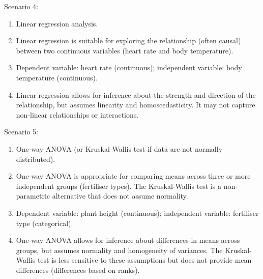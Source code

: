 \documentclass[
  10t,
]{article}
\providecommand{\tightlist}{%
  \setlength{\itemsep}{0pt}\setlength{\parskip}{0pt}}
\begin{document}
Scenario 4:

\begin{enumerate}
\def\labelenumi{\alph{enumi}.}
\tightlist
\item
  Linear regression analysis.
\item
  Linear regression is suitable for exploring the relationship (often
  causal) between two continuous variables (heart rate and body
  temperature).
\item
  Dependent variable: heart rate (continuous); independent variable:
  body temperature (continuous).
\item
  Linear regression allows for inference about the strength and
  direction of the relationship, but assumes linearity and
  homoscedasticity. It may not capture non-linear relationships or
  interactions.
\end{enumerate}

Scenario 5:

\begin{enumerate}
\def\labelenumi{\alph{enumi}.}
\tightlist
\item
  One-way ANOVA (or Kruskal-Wallis test if data are not normally
  distributed).
\item
  One-way ANOVA is appropriate for comparing means across three or more
  independent groups (fertiliser types). The Kruskal-Wallis test is a
  non-parametric alternative that does not assume normality.
\item
  Dependent variable: plant height (continuous); independent variable:
  fertiliser type (categorical).
\item
  One-way ANOVA allows for inference about differences in means across
  groups, but assumes normality and homogeneity of variances. The
  Kruskal-Wallis test is less sensitive to these assumptions but does
  not provide mean differences (differences based on ranks).
\end{enumerate}
\end{document}
